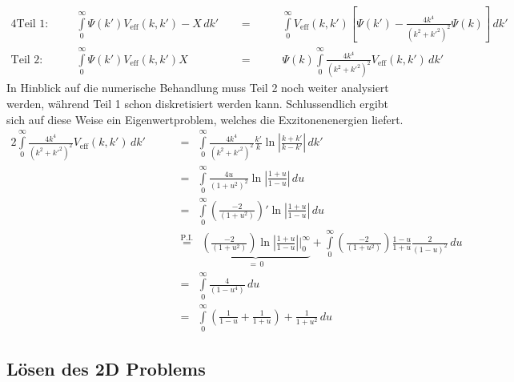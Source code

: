 \begin{alignat*}{4}
\text{Teil 1:}\qquad 	&&  \int\limits_{0}^{\infty} \Psi(k ')V_\text{eff}(k,k')-X \,dk' && \ \ = \ \ &&
											&\int\limits_{0}^{\infty} V_\text{eff}(k,k')\left [\Psi(k ')-\frac{4k^4}{(k^2+k '^2)^2}\Psi(k)\right ]\,dk'  \\ 
\text{Teil 2:}\qquad 	&& 	\int\limits_{0}^{\infty} \Psi(k ')V_\text{eff}(k,k')X   && \ \ = \ \ &&
											&\Psi(k)\int\limits_{0}^{\infty} \frac{4k^4}{(k^2+k '^2)^2}V_\text{eff}(k,k')\,dk'
\end{alignat*}
In Hinblick auf die numerische Behandlung muss Teil 2 noch weiter analysiert werden, während Teil 1 schon diskretisiert werden kann. Schlussendlich ergibt sich auf diese Weise ein Eigenwertproblem, welches die Exzitonenenergien liefert. 
\begin{alignat*}{2}
\int\limits_{0}^{\infty} \frac{4k^4}{(k^2+k '^2)^2}V_\text{eff}(k,k')\,dk' 
						&& \ \ &=\ \ \int\limits_{0}^{\infty} \frac{4k^4}{(k^2+k '^2)^2}\frac{k '}{k}\ln{\left |\frac{k + k '}{k-k'}\right |}\,dk' \\
						&& \ \ &=\ \ 	\int\limits_{0}^{\infty} \frac{4u}{(1+u^2)^2}\ln{\left |\frac{1 + u}{1-u}\right |}\,du \\
						&& \ \ &=\ \ 	\int\limits_{0}^{\infty} \left (\frac{-2}{(1+u^2)}\right )'\ln{\left |\frac{1 + u}{1-u}\right |}\,du \\
						&& \ \ &\stackrel{\text{P.I.}}{=}\ \ \underbrace{\left (\frac{-2}{(1+u^2)}\right )\ln{\left | \frac{1 + u}{1-u}\right |}\Big |_{0}^{\infty}}_{=\,0}
						+\int\limits_{0}^{\infty} \left (\frac{-2}{(1+u^2)}\right )\frac{1 - u}{1+u}\frac{2}{(1-u)^2}\,du \\
						&& \ \ &=\ \ 	\int\limits_{0}^{\infty} \frac{4}{(1-u^4)}\,du  \\
						&& \ \ &=\ \ 	\int\limits_{0}^{\infty} \left (\frac{1}{1-u}+\frac{1}{1+u}\right )+\frac{1}{1+u^2}\,du  
\end{alignat*}
\subsection{Lösen des 2D Problems}
